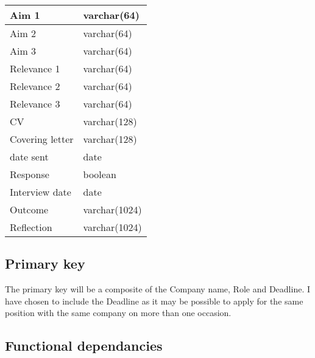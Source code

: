 \documentclass[a4paper, twoside]{article}
\begin{document}
\begin{center}
\begin{tabular}{|l|l|}
Aim 1 & varchar(64) \\ \hline
Aim 2 & varchar(64) \\ \hline
Aim 3 & varchar(64) \\ \hline
Relevance 1 & varchar(64) \\ \hline
Relevance 2 & varchar(64) \\ \hline
Relevance 3 & varchar(64) \\ \hline
CV & varchar(128) \\ \hline
Covering letter & varchar(128) \\ \hline
date sent & date \\ \hline
Response & boolean \\ \hline
Interview date & date \\ \hline
Outcome & varchar(1024) \\ \hline
Reflection & varchar(1024) \\
\hline
\end{tabular}
\end{center}

\subsection{Primary key}
The primary key will be a composite of the Company name, Role and Deadline. I
have chosen to include the Deadline as it may be possible to apply for the same
position with the same company on more than one occasion.

\subsection{Functional dependancies}
\end{document}
